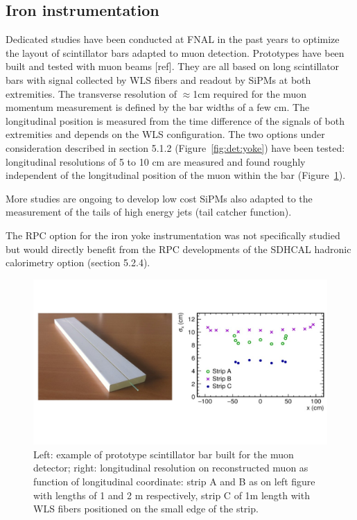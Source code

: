 


\subsection{Iron instrumentation}

Dedicated studies have been conducted at FNAL in the past years to optimize the layout of scintillator bars adapted to muon detection. Prototypes have been built and tested with muon beams [ref]. They are all based on long scintillator bars with signal collected by WLS fibers and readout by SiPMs at both extremities. The transverse resolution of $\approx$1cm required for the muon momentum measurement is defined by the bar widths of a few cm. The longitudinal position is measured from the time difference of the signals of both extremities and depends on the WLS configuration. The two options under consideration described in section 5.1.2 (Figure~\ref{fig:det:yoke}) have been tested: longitudinal resolutions of 5 to 10 cm are measured and found roughly independent of the longitudinal position of the muon within the bar (Figure~\ref{fig:det:Iron_proto}). 

More studies are ongoing to develop low cost SiPMs also adapted to the measurement of the tails of high energy jets (tail catcher function). 

The RPC option for the iron yoke instrumentation was not specifically studied but would directly benefit from the RPC developments of the SDHCAL hadronic calorimetry option (section 5.2.4).   


\begin{figure}[t!]
\centering
\includegraphics[width=1.0\hsize]{Detector/fig/Iron_proto.jpg}
\caption{Left: example of prototype scintillator bar built for the muon detector; right: longitudinal resolution on reconstructed muon as function of longitudinal coordinate: strip A and B as on left figure with lengths of 1 and 2 m respectively, strip C of 1m length with WLS fibers positioned on the small edge of the strip.}
\label{fig:det:Iron_proto}
\end{figure}

\vspace{2cm}